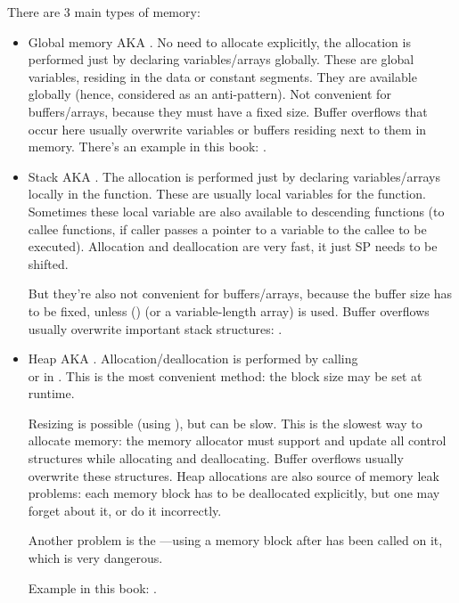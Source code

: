 ﻿

There are 3 main types of memory:

\begin{itemize}
\item
Global memory \ac{AKA} .
No need to allocate explicitly, the allocation is performed just by declaring variables/arrays 
globally.
These are global variables, residing in the data or constant segments.
They are available globally (hence, considered as an \gls{anti-pattern}).
Not convenient for buffers/arrays, because they must have a fixed size.
Buffer overflows that occur here usually overwrite variables or buffers residing next to them in memory.
There's an example in this book: .

\item
Stack \ac{AKA} .
The allocation is performed just by declaring variables/arrays locally in the function.
These are usually local variables for the function.
Sometimes these local variable are also available to descending functions 
(to \gls{callee} functions, if caller passes a pointer to a variable to the \gls{callee} to be executed).
Allocation and deallocation are very fast, it just \ac{SP} needs to be shifted.

But they're also not convenient for buffers/arrays, because the buffer size has to be fixed,
unless  () (or a variable-length array) is used.
Buffer overflows usually overwrite important stack structures: .

\item
Heap \ac{AKA} .
Allocation/deallocation is performed by calling \\
 or  in \Cpp.
This is the most convenient method: the block size may be set at runtime.

Resizing is possible (using ), but can be slow.
This is the slowest way to allocate memory: 
the memory allocator must support and update all control structures while
allocating and deallocating.
Buffer overflows usually overwrite these structures.
Heap allocations are also source of memory leak problems: each memory block has to be deallocated
explicitly, but one may forget about it, or do it incorrectly.

Another problem is the ---using a memory block after  has been called on it,
which is very dangerous.

Example in this book: .

\end{itemize}
